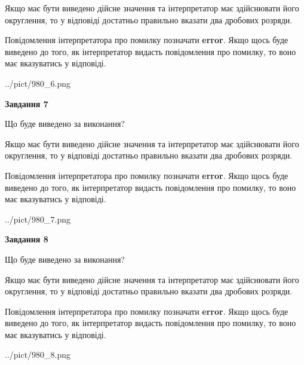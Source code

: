 \documentclass[12pt, ukrainian]{article}
\begin{document}
{\begin {Large}
Якщо має бути виведено дійсне значення та інтерпретатор має здійснювати його округлення, 
то у відповіді достатньо правильно вказати два дробових розряди.

Повідомлення інтерпретатора про помилку позначати \textbf{error}.
Якщо щось буде виведено до того, як інтерпретатор видасть повідомлення про помилку, 
то воно має вказуватись у відповіді. \par

\begin{center}
	{../pict/980_6.png}
\end{center}
\newpage

{\begin {center}\textbf{Завдання 7}\end {center}}\par
Що буде виведено за виконання? \par

Якщо має бути виведено дійсне значення та інтерпретатор має здійснювати його округлення, 
то у відповіді достатньо правильно вказати два дробових розряди.

Повідомлення інтерпретатора про помилку позначати \textbf{error}.
Якщо щось буде виведено до того, як інтерпретатор видасть повідомлення про помилку, 
то воно має вказуватись у відповіді. \par

\begin{center}
	{../pict/980_7.png}
\end{center}
\newpage

{\begin {center}\textbf{Завдання 8}\end {center}}\par
Що буде виведено за виконання? \par

Якщо має бути виведено дійсне значення та інтерпретатор має здійснювати його округлення, 
то у відповіді достатньо правильно вказати два дробових розряди.

Повідомлення інтерпретатора про помилку позначати \textbf{error}.
Якщо щось буде виведено до того, як інтерпретатор видасть повідомлення про помилку, 
то воно має вказуватись у відповіді. \par

\begin{center}
	{../pict/980_8.png}
\end{center}
\newpage


\end{Large}}
\end{document}
